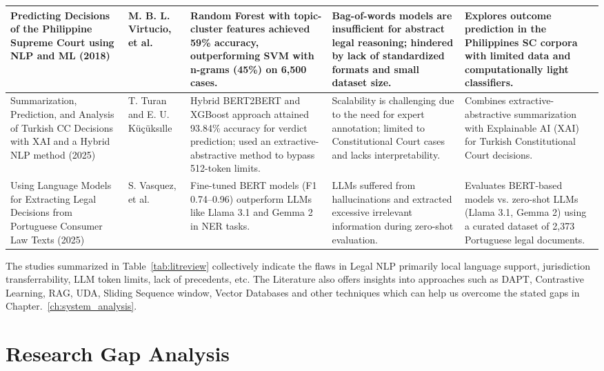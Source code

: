 {\begin{longtable}{|p{}|p{}|>{\raggedright\arraybackslash}p{}|>{\raggedright\arraybackslash}p{}|>{\raggedright\arraybackslash}p{}|}
Predicting Decisions of the Philippine Supreme Court using NLP and ML (2018)~\cite{b23} & 
M. B. L. Virtucio, et al. & 
Random Forest with topic-cluster features achieved 59\% accuracy, outperforming SVM with n-grams (45\%) on 6,500 cases. & 
Bag-of-words models are insufficient for abstract legal reasoning; hindered by lack of standardized formats and small dataset size. & 
Explores outcome prediction in the Philippines SC corpora with limited data and computationally light classifiers. \\ \hline


Summarization, Prediction, and Analysis of Turkish CC Decisions with XAI and a Hybrid NLP method (2025)~\cite{b24} & 
T. Turan and E. U. Küçüksılle & 
Hybrid BERT2BERT and XGBoost approach attained 93.84\% accuracy for verdict prediction; used an extractive-abstractive method to bypass 512-token limits. & 
Scalability is challenging due to the need for expert annotation; limited to Constitutional Court cases and lacks interpretability. & 
Combines extractive-abstractive summarization with Explainable AI (XAI) for Turkish Constitutional Court decisions. \\ \hline


Using Language Models for Extracting Legal Decisions from Portuguese Consumer Law Texts (2025)~\cite{b25} & 
S. Vasquez, et al. & 
Fine-tuned BERT models (F1 0.74--0.96) outperform LLMs like Llama 3.1 and Gemma 2 in NER tasks. & 
LLMs suffered from hallucinations and extracted excessive irrelevant information during zero-shot evaluation. & 
Evaluates BERT-based models vs. zero-shot LLMs (Llama 3.1, Gemma 2) using a curated dataset of 2,373 Portuguese legal documents. \\ \hline

\end{longtable}}

\noindent The studies summarized in Table~\ref{tab:litreview} collectively indicate the flaws in Legal NLP primarily local language support, jurisdiction transferrability, LLM token limits, lack of precedents, etc. The Literature also offers insights into approaches such as DAPT, Contrastive Learning, RAG, UDA, Sliding Sequence window, Vector Databases and other techniques which can help us overcome the stated gaps in Chapter.~\ref{ch:system_analysis}.





\newpage

\section{Research Gap Analysis}\label{sec:gap_analysis}

